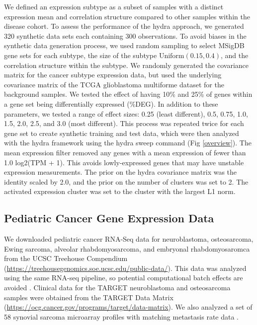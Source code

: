 \documentclass[10pt,letterpaper]{article}
\begin{document}
We defined an expression subtype as a subset of samples with a distinct expression mean and correlation structure compared to other samples within the disease cohort. To assess the performance of the hydra approach, we generated 320 synthetic data sets each containing 300 observations. To avoid biases in the synthetic data generation process, we used random sampling to select MSigDB gene sets for each subtype, the size of the subtype $\text{Uniform}(0.15, 0.4)$, and the correlation structure within the subtype. We randomly generated the covariance matrix for the cancer subtype expression data, but used the underlying covariance matrix of the TCGA glioblastoma multiforme dataset for the background samples. We tested the effect of having 10\% and 25\% of genes within a gene set being differentially expressed (\%DEG). In addition to these parameters, we tested a range of effect sizes: 0.25 (least different), 0.5, 0.75, 1.0, 1.5, 2.0, 2.5, and 3.0 (most different). This process was repeated twice for each gene set to create synthetic training and test data, which were then analyzed with the hydra framework using the hydra sweep command (Fig \ref{overview}). The mean expression filter removed any genes with a mean expression of fewer than 1.0 log2(TPM + 1). This avoids lowly-expressed genes that may have unstable expression measurements. The prior on the hydra covariance matrix was the identity scaled by 2.0, and the prior on the number of clusters was set to 2. The activated expression cluster was set to the cluster with the largest L1 norm.


\subsection{Pediatric Cancer Gene Expression Data}
We downloaded pediatric cancer RNA-Seq data for neuroblastoma, osteosarcoma, Ewing sarcoma, alveolar rhabdomyosarcoma, and embryonal rhabdomyosaromca from the UCSC Treehouse Compendium (\url{https://treehousegenomics.soe.ucsc.edu/public-data/}). This data was analyzed using the same RNA-seq pipeline, so potential computational batch effects are avoided \cite{vivianToilEnablesReproducible2017}. Clinical data for the TARGET neuroblastoma and osteosarcoma samples were obtained from the TARGET Data Matrix (\url{https://ocg.cancer.gov/programs/target/data-matrix}). We also analyzed a set of 58 synovial sarcoma microarray profiles with matching metastasis rate data \cite{lagardeChromosomeInstabilityAccounts2013}.
 
\end{document}
